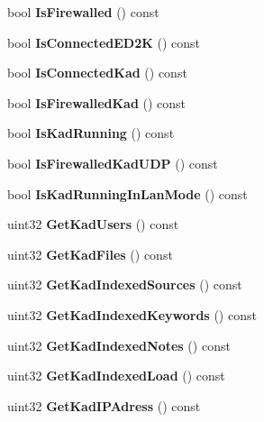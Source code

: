 \begin{DoxyCompactItemize}
\item 
bool {\bfseries IsFirewalled} () const \label{classCamuleRemoteGuiApp_a73821b1a646408e1e674e3517073e1eb}

\item 
bool {\bfseries IsConnectedED2K} () const \label{classCamuleRemoteGuiApp_a298b6317fc2f15b825baa31749d3452f}

\item 
bool {\bfseries IsConnectedKad} () const \label{classCamuleRemoteGuiApp_acbf0bd187975ea706e86ba34de28e675}

\item 
bool {\bfseries IsFirewalledKad} () const \label{classCamuleRemoteGuiApp_a1f72f9faf87436ef685d201d1abe1fdf}

\item 
bool {\bfseries IsKadRunning} () const \label{classCamuleRemoteGuiApp_a08445d02c414c4a3576442261d4e007c}

\item 
bool {\bfseries IsFirewalledKadUDP} () const \label{classCamuleRemoteGuiApp_a71ba6e17bd7de6b746169eb4b858b2c6}

\item 
bool {\bfseries IsKadRunningInLanMode} () const \label{classCamuleRemoteGuiApp_a97070828e0e127dcf873270edb6b1061}

\item 
uint32 {\bfseries GetKadUsers} () const \label{classCamuleRemoteGuiApp_a7c96f066f63a1571150fd21cfa566cb8}

\item 
uint32 {\bfseries GetKadFiles} () const \label{classCamuleRemoteGuiApp_a26da0c8aaa80c75d989071cf2cfce81f}

\item 
uint32 {\bfseries GetKadIndexedSources} () const \label{classCamuleRemoteGuiApp_aaa1edb4bd4f4ace1caa9971280e1a481}

\item 
uint32 {\bfseries GetKadIndexedKeywords} () const \label{classCamuleRemoteGuiApp_aa7e7f934fed9cdb9030702b190904d0f}

\item 
uint32 {\bfseries GetKadIndexedNotes} () const \label{classCamuleRemoteGuiApp_a084c2625c08c7ec500e4b109fa446132}

\item 
uint32 {\bfseries GetKadIndexedLoad} () const \label{classCamuleRemoteGuiApp_a0241548e774ad9022db74d9b0e746826}

\item 
uint32 {\bfseries GetKadIPAdress} () const \label{classCamuleRemoteGuiApp_a57ca40d3f8221a2af97387c296ace23d}


\end{DoxyCompactItemize}
